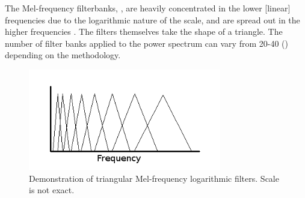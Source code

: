 The Mel-frequency filterbanks, \DIFdelbegin {}\DIFdelend \DIFaddbegin {}\DIFaddend , are heavily concentrated in the lower [linear] frequencies \DIFdelbegin {}\DIFdelend due to the logarithmic nature of the scale, and are spread out in the higher frequencies \DIFaddbegin {}\DIFaddend . The filters themselves take the shape of a triangle.  The number of filter banks applied to the power spectrum can vary from 20-40 (\cite{honig:05,gold:11}) depending on the methodology. 

\begin{figure}[h]
\centering
\includegraphics[width=0.75\textwidth]{figure/filt-mfcc.png}
\caption{Demonstration of triangular Mel-frequency logarithmic filters. Scale is not exact.}\label{fig:filt-mfcc}
\end{figure}

